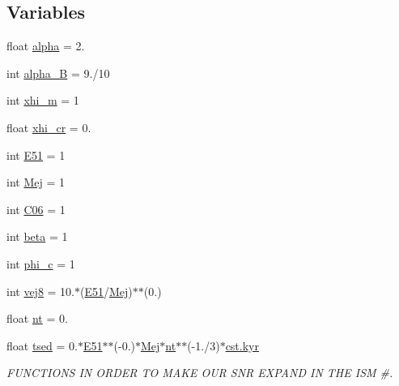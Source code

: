 \subsection*{Variables}
\begin{DoxyCompactItemize}
\item 
float \hyperlink{namespaceelectrons__emax__t_a2ca4cffb383bb74bb2caacc4e62728b4}{alpha} = 2.
\item 
int \hyperlink{namespaceelectrons__emax__t_a80e5be66eafafacb2d2f62f7dbfaf8d5}{alpha\+\_\+B} = 9./10
\item 
int \hyperlink{namespaceelectrons__emax__t_acd80c62877ec9db1edb4a8662b7347f7}{xhi\+\_\+m} = 1
\item 
float \hyperlink{namespaceelectrons__emax__t_ac149ba9f878c8ef893acd0eb12c64e1c}{xhi\+\_\+cr} = 0.
\item 
int \hyperlink{namespaceelectrons__emax__t_a60b4c05f730fff0bc98b225162ee76c3}{E51} = 1
\item 
int \hyperlink{namespaceelectrons__emax__t_a9373df60b4e1199cb22af1e4a4316073}{Mej} = 1
\item 
int \hyperlink{namespaceelectrons__emax__t_a22d8dded65a2383b75f47fd297f99246}{C06} = 1
\item 
int \hyperlink{namespaceelectrons__emax__t_ab534d5dd0fcc01f9c4c103d5a29ae5c0}{beta} = 1
\item 
int \hyperlink{namespaceelectrons__emax__t_a7f204cad5b45e51bb9dccc93880d31cc}{phi\+\_\+c} = 1
\item 
int \hyperlink{namespaceelectrons__emax__t_a9fde8350249696a36959b975c66a05ed}{vej8} = 10.$\ast$(\hyperlink{namespaceelectrons__emax__t_a60b4c05f730fff0bc98b225162ee76c3}{E51}/\hyperlink{namespaceelectrons__emax__t_a9373df60b4e1199cb22af1e4a4316073}{Mej})$\ast$$\ast$(0.)
\item 
float \hyperlink{namespaceelectrons__emax__t_af39d537cdc6ea46e3e9f97d4d3f61a07}{nt} = 0.
\item 
float \hyperlink{namespaceelectrons__emax__t_a6fb496915cb2791785758534ac0a8ad6}{tsed} = 0.$\ast$\hyperlink{namespaceelectrons__emax__t_a60b4c05f730fff0bc98b225162ee76c3}{E51}$\ast$$\ast$(-\/0.)$\ast$\hyperlink{namespaceelectrons__emax__t_a9373df60b4e1199cb22af1e4a4316073}{Mej}$\ast$\hyperlink{namespaceelectrons__emax__t_af39d537cdc6ea46e3e9f97d4d3f61a07}{nt}$\ast$$\ast$(-\/1./3)$\ast$\hyperlink{constants_8h_a0edf155739e92555799f4a04b10af6bf}{cst.\+kyr}
\begin{DoxyCompactList}\small\item\em F\+U\+N\+C\+T\+I\+O\+NS IN O\+R\+D\+ER TO M\+A\+KE O\+UR S\+NR E\+X\+P\+A\+ND IN T\+HE I\+SM \#. \end{DoxyCompactList}\item 
$$
\end{DoxyCompactItemize}
